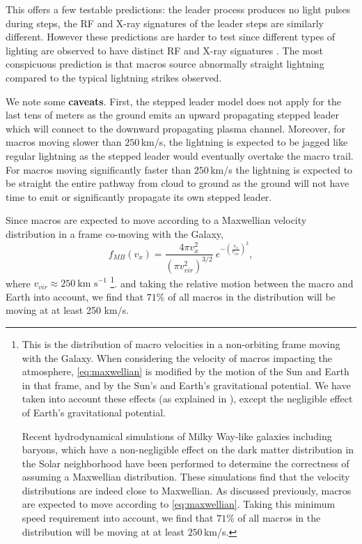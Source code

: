 \documentclass[%
 reprint,
 amsmath,amssymb,
 aps,
]{revtex4-2}
\begin{document}
        This offers a few testable predictions: the leader process produces no light pulses during steps, the RF and X-ray signatures of the leader steps are similarly different. However these predictions are harder to test since different types of lighting are observed to have distinct RF and X-ray signatures \citep{Hare2020}. The most conspicuous prediction is that {macros source abnormally straight lightning} compared to the typical lightning strikes observed.

        We note some \textbf{caveats}. First, the stepped leader model does not apply for the last tens of meters as the ground emits an upward propagating stepped leader which will connect to the downward propagating plasma channel. Moreover, for macros moving slower than $250\,$km/s, the lightning is expected to be jagged like regular lightning as the stepped leader would eventually overtake the macro trail. For macros moving significantly faster than $250\,$km/s the lightning is expected to be straight the entire pathway from cloud to ground as the ground will not have time to emit or significantly propagate its own stepped leader. 

        Since macros are expected to move according to a Maxwellian velocity distribution in a frame co-moving with the Galaxy,
        \begin{equation}\label{eq:maxwellian}
        	f_{MB}(v_x) = 
        		\frac{4\pi v_x^2}
        		{\left({\pi v_{vir}^2}\right)^{3/2}}~
        		e^{-\left(\frac{v_x}{v_{vir}}\right)^2}, 
        \end{equation}
        where $v_{vir} \approx 250~ \text{km s}^{-1}$ \footnote{
        	This is the distribution of macro velocities in a non-orbiting frame moving with the Galaxy. When considering the velocity of macros impacting the atmosphere, \eqref{eq:maxwellian} is modified by the motion of the Sun and Earth in that frame, and by the Sun's and Earth's gravitational potential. We have taken into account these effects (as explained in \citet{Freese2013}), except the negligible effect of Earth's gravitational potential.

        	Recent hydrodynamical simulations of Milky Way-like galaxies including baryons, which have a non-negligible effect on the dark matter distribution in the Solar neighborhood \citep{Tanabashi2018} have been performed to determine the correctness of assuming a Maxwellian distribution. These simulations find that the velocity distributions are indeed close to Maxwellian. As discussed previously, macros are expected to move according to \eqref{eq:maxwellian}. Taking this minimum speed requirement into account, we find that $71\%$ of all macros in the distribution will be moving at at least $250\,$km/s. 
    	}.
        and taking the relative motion between the macro and Earth into account, we find that $71\%$ of all macros in the distribution will be moving at at least 250 km/s.
\end{document}
